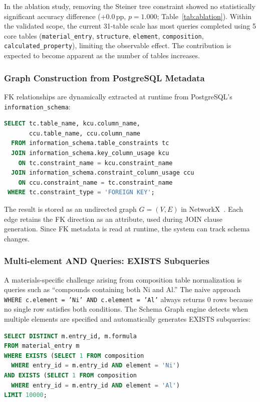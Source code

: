 \documentclass{npj-compt.mater}
\begin{document}
In the ablation study, removing the Steiner tree constraint showed
no statistically significant accuracy difference ($+$0.0\,pp, $p=1.000$;
Table~\ref{tab:ablation}).
Within the validated scope, the current 31-table scale has most queries
completed using 5 core tables
(\texttt{material\_entry}, \texttt{structure}, \texttt{element},
\texttt{composition}, \texttt{calculated\_property}),
limiting the observable effect.
The contribution is expected to become apparent as the number of tables increases.

\subsubsection{Graph Construction from PostgreSQL Metadata}

FK relationships are dynamically extracted at runtime from
PostgreSQL's \texttt{information\_schema}:

\begin{lstlisting}[language=SQL,caption={FK relationship extraction},label=lst:fk_query,numbers=none]
SELECT tc.table_name, kcu.column_name,
       ccu.table_name, ccu.column_name
  FROM information_schema.table_constraints tc
  JOIN information_schema.key_column_usage kcu
    ON tc.constraint_name = kcu.constraint_name
  JOIN information_schema.constraint_column_usage ccu
    ON ccu.constraint_name = tc.constraint_name
 WHERE tc.constraint_type = 'FOREIGN KEY';
\end{lstlisting}

The result is stored as an undirected graph $G = (V, E)$ in NetworkX~\cite{networkx2008}.
Each edge retains the FK direction as an attribute, used during JOIN clause generation.
Since FK metadata is read at runtime, the system can track schema changes.

\subsubsection{Multi-element AND Queries: EXISTS Subqueries}
\label{sec:multi_element}

A materials-specific challenge arising from composition table normalization is
queries such as ``compounds containing both Ni and Al.''
The naive approach \texttt{WHERE c.element = 'Ni' AND c.element = 'Al'}
always returns 0 rows because no single row satisfies both conditions.
The Schema Graph engine detects when multiple elements are specified and
automatically generates EXISTS subqueries:

\begin{lstlisting}[language=SQL,caption={Multi-element AND},label=lst:exists,numbers=none]
SELECT DISTINCT m.entry_id, m.formula
FROM material_entry m
WHERE EXISTS (SELECT 1 FROM composition
  WHERE entry_id = m.entry_id AND element = 'Ni')
AND EXISTS (SELECT 1 FROM composition
  WHERE entry_id = m.entry_id AND element = 'Al')
LIMIT 10000;
\end{lstlisting}
\end{document}
